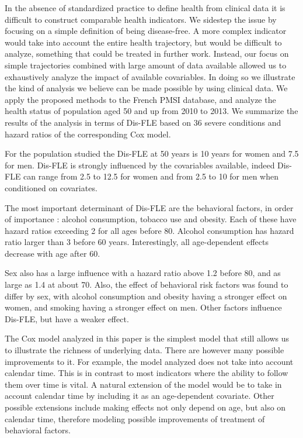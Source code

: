 \documentclass{article}
\begin{document}
In the absence of standardized practice to define health from clinical
data it is difficult to construct comparable health indicators. We
sidestep the issue by focusing on a simple definition of being
disease-free. A more complex indicator would take into account the
entire health trajectory, but would be difficult to analyze, something
that could be treated in further work. Instead, our focus on simple
trajectories combined with large amount of data available allowed us to
exhaustively analyze the impact of available covariables. In doing so we
illustrate the kind of analysis we believe can be made possible by using
clinical data. We apply the proposed methods to the French PMSI
database, and analyze the health status of population aged 50 and up
from 2010 to 2013. We summarize the results of the analysis in terms of
Dis-FLE based on 36 severe conditions and hazard ratios of the
corresponding Cox model.

For the population studied the Dis-FLE at 50 years is 10 years for women
and 7.5 for men. Dis-FLE is strongly influenced by the covariables
available, indeed Dis-FLE can range from 2.5 to 12.5 for women and from
2.5 to 10 for men when conditioned on covariates.

The most important determinant of Dis-FLE are the behavioral factors, in
order of importance : alcohol consumption, tobacco use and obesity. Each
of these have hazard ratios exceeding 2 for all ages before 80. Alcohol
consumption has hazard ratio larger than 3 before 60 years.
Interestingly, all age-dependent effects decrease with age after 60.

Sex also has a large influence with a hazard ratio above 1.2 before 80,
and as large as 1.4 at about 70. Also, the effect of behavioral risk
factors was found to differ by sex, with alcohol consumption and obesity
having a stronger effect on women, and smoking having a stronger effect
on men. Other factors influence Dis-FLE, but have a weaker effect.

The Cox model analyzed in this paper is the simplest model that still
allows us to illustrate the richness of underlying data. There are
however many possible improvements to it. For example, the model
analyzed does not take into account calendar time. This is in contrast
to most indicators where the ability to follow them over time is vital.
A natural extension of the model would be to take in account calendar
time by including it as an age-dependent covariate. Other possible
extensions include making effects not only depend on age, but also on
calendar time, therefore modeling possible improvements of treatment of
behavioral factors.
\end{document}
